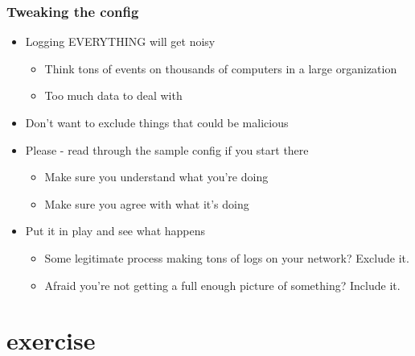 \subsubsection*{Tweaking the config}
\begin{itemize}
  \item Logging EVERYTHING will get noisy
  \begin{itemize}
    \item Think tons of events on thousands of computers in a large organization
    \item Too much data to deal with
  \end{itemize}
  \item Don't want to exclude things that could be malicious
  \item Please - read through the sample config if you start there
  \begin{itemize}
    \item Make sure you understand what you're doing
    \item Make sure you agree with what it's doing
  \end{itemize}
  \item Put it in play and see what happens
  \begin{itemize}
    \item Some legitimate process making tons of logs on your network? Exclude it.
    \item Afraid you're not getting a full enough picture of something? Include it.
  \end{itemize}
\end{itemize}

\section{exercise}

